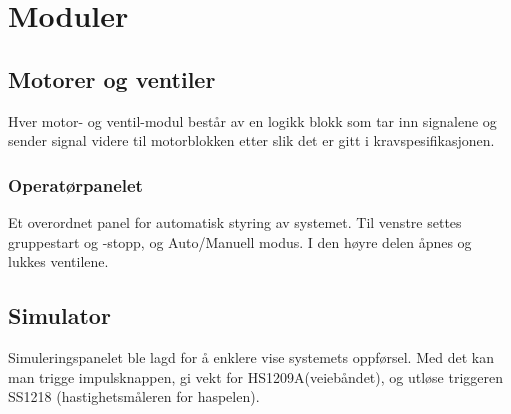 \section{Moduler}
\subsection{Motorer og ventiler}
	Hver motor- og ventil-modul består av en logikk blokk som tar inn signalene og sender signal videre til motorblokken etter slik det er gitt i kravspesifikasjonen.

\subsubsection{Operatørpanelet}
	Et overordnet panel for automatisk styring av systemet. Til venstre settes gruppestart og -stopp, og Auto/Manuell modus. I den høyre delen åpnes og lukkes ventilene.

\subsection{Simulator}
	Simuleringspanelet ble lagd for å enklere vise systemets oppførsel. Med det kan man trigge impulsknappen, gi vekt for HS1209A(veiebåndet), og utløse triggeren SS1218 (hastighetsmåleren for haspelen).
